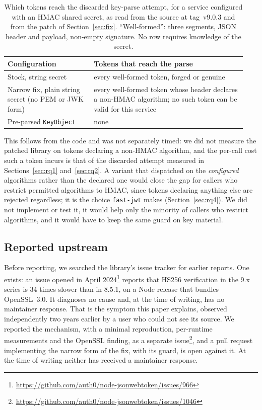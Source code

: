 \documentclass[preprint,12pt,authoryear]{elsarticle}
\newcommand{\LibraryTag}{tag~v9.0.3}
\begin{document}
\begin{table}[!t]
\caption{Which tokens reach the discarded key-parse attempt, for a service
configured with an HMAC shared secret, as read from the source at
\LibraryTag{} and from the patch of Section~\ref{sec:fix}. ``Well-formed'':
three segments, JSON header and payload, non-empty signature. No row requires
knowledge of the secret.}
\label{tab:reach}
\small
\begin{tabular}{@{}p{0.34\linewidth}p{0.6\linewidth}@{}}
\toprule
Configuration & Tokens that reach the parse \\
\midrule
Stock, string secret & every well-formed token, forged or genuine \\
Narrow fix, plain string secret (no PEM or JWK form) & every well-formed token whose header declares a
non-HMAC algorithm; no such token can be valid for this service \\
Pre-parsed \texttt{KeyObject} & none \\
\bottomrule
\end{tabular}
\end{table}

This follows from the code and was not separately timed: we did not measure
the patched library on tokens declaring a non-HMAC algorithm, and the per-call
cost such a token incurs is that of the discarded attempt measured in
Sections~\ref{sec:rq1} and~\ref{sec:rq2}. A variant that dispatched on the
\emph{configured} algorithms rather than the declared one would close the gap
for callers who restrict permitted algorithms to HMAC, since tokens declaring
anything else are rejected regardless; it is the choice \texttt{fast-jwt}
makes (Section~\ref{sec:rq4}). We did not implement or test it, it would help
only the minority of callers who restrict algorithms, and it would have to keep
the same guard on key material.

\subsection{Reported upstream}\label{sec:upstream}

Before reporting, we searched the library's issue
tracker for earlier reports. One exists: an issue opened in April
2024\footnote{\url{https://github.com/auth0/node-jsonwebtoken/issues/966}} reports that HS256 verification in the 9.x
series is 34 times slower than in 8.5.1, on a Node release that bundles
OpenSSL~3.0. It diagnoses no cause and, at the time of writing, has no
maintainer response. That is the symptom this paper explains, observed
independently two years earlier by a user who could not see its source. We
reported the mechanism, with a minimal reproduction, per-runtime measurements
and the OpenSSL finding, as a separate
issue\footnote{\url{https://github.com/auth0/node-jsonwebtoken/issues/1046}}, and
a pull request implementing the narrow form of the fix, with its guard, is open
against it.
At the time of writing neither has received a maintainer response.
\end{document}
